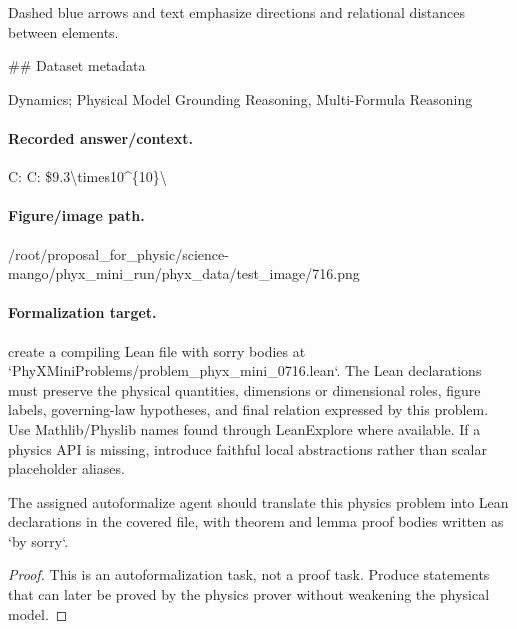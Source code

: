 Dashed blue arrows and text emphasize directions and relational distances between elements.

\#\# Dataset metadata

Dynamics; Physical Model Grounding Reasoning, Multi-Formula Reasoning

\paragraph{Recorded answer/context.}
C: C: \$9.3\textbackslash{}times10\textasciicircum{}\{10\}\textbackslash{}

\paragraph{Figure/image path.}
/root/proposal\_for\_physic/science-mango/phyx\_mini\_run/phyx\_data/test\_image/716.png

\paragraph{Formalization target.}
create a compiling Lean file with sorry bodies at `PhyXMiniProblems/problem\_phyx\_mini\_0716.lean`. The Lean declarations must preserve the physical quantities, dimensions or dimensional roles, figure labels, governing-law hypotheses, and final relation expressed by this problem.
Use Mathlib/Physlib names found through LeanExplore where available. If a physics API is missing, introduce faithful local abstractions rather than scalar placeholder aliases.

\begin{theorem}
\label{thm:physics:phyx_mini_0716:target}
The assigned autoformalize agent should translate this physics problem into Lean declarations in the covered file, with theorem and lemma proof bodies written as `by sorry`.
\end{theorem}
\begin{proof}
This is an autoformalization task, not a proof task. Produce statements that can later be proved by the physics prover without weakening the physical model.
\end{proof}

